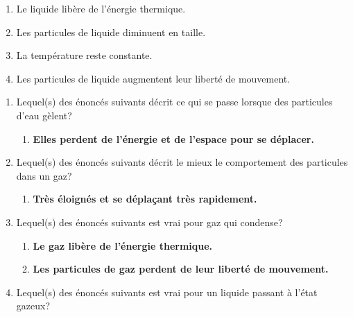 \documentclass[
  11pt,
  french,
  a4paper,
  openany]{book}
\providecommand{\tightlist}{%
  \setlength{\itemsep}{0pt}\setlength{\parskip}{0pt}}
\begin{document}
\begin{Exercise}
\begin{enumerate}
  \begin{enumerate}
  \def\labelenumii{\alph{enumii}.}
  \tightlist
  \item
    Le liquide libère de l'énergie thermique.
  \item
    Les particules de liquide diminuent en taille.
  \item
    La température reste constante.
  \item
    Les particules de liquide augmentent leur liberté de mouvement.
  \end{enumerate}
\end{enumerate}


\end{Exercise}

\begin{Answer}

\begin{enumerate}
\def\labelenumi{\arabic{enumi}.}
\tightlist
\item
  Lequel(s) des énoncés suivants décrit ce qui se passe lorsque des particules d'eau gèlent?

  \begin{enumerate}
  \def\labelenumii{\alph{enumii}.}
  \setcounter{enumii}{3}
  \tightlist
  \item
    \textbf{Elles perdent de l'énergie et de l'espace pour se déplacer.}
  \end{enumerate}
\item
  Lequel(s) des énoncés suivants décrit le mieux le comportement des particules dans un gaz?

  \begin{enumerate}
  \def\labelenumii{\alph{enumii}.}
  \setcounter{enumii}{3}
  \tightlist
  \item
    \textbf{Très éloignés et se déplaçant très rapidement.}
  \end{enumerate}
\item
  Lequel(s) des énoncés suivants est vrai pour gaz qui condense?

  \begin{enumerate}
  \def\labelenumii{\alph{enumii}.}
  \tightlist
  \item
    \textbf{Le gaz libère de l'énergie thermique.}
  \item
    \textbf{Les particules de gaz perdent de leur liberté de mouvement.}
  \end{enumerate}
\item
  Lequel(s) des énoncés suivants est vrai pour un liquide passant à l'état gazeux?


\end{enumerate}
\end{Answer}
\end{document}
